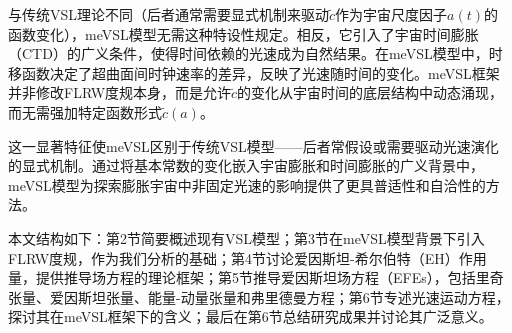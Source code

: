 \documentclass[jkps,preprint,fleqn]{revtex4}
\newcommand{\tc}{\tilde{c}}
\begin{document}
与传统VSL理论不同（后者通常需要显式机制来驱动$\tc$作为宇宙尺度因子$a(t)$的函数变化），meVSL模型无需这种特设性规定。相反，它引入了宇宙时间膨胀（CTD）的广义条件，使得时间依赖的光速成为自然结果。在meVSL模型中，时移函数决定了超曲面间时钟速率的差异，反映了光速随时间的变化\cite{Lee:2024zcu}。meVSL框架并非修改FLRW度规本身，而是允许$\tc$的变化从宇宙时间的底层结构中动态涌现，而无需强加特定函数形式$\tc(a)$。

这一显著特征使meVSL区别于传统VSL模型——后者常假设或需要驱动光速演化的显式机制\cite{Avelino:1999is,Belinchon:1999kq,Avelino:2000ph,Szydlowski:2002kz,Magueijo:2003gj,Shojaie:2004sq,Shojaie:2004xw,Balcerzak:2013kha,Balcerzak:2014rga,Franzmann:2017nsc,Hanimeli:2019wrt,Skara:2019usd,Bhattacharjee:2020fgl,Gupta:2020anq,Cuzinatto:2022mfe,Cuzinatto:2022vvy,Cuzinatto:2022dta,Bileska:2024odt,Coleman:1997xq,Albrecht:1998ir,Barrow:1998df,Barrow:1999is,Bassett:2000wj,Jacobson:2000xp,Magueijo:2000zt,Clayton:1998hv,Drummond:1999ut,Clayton:1999zs,Liberati:2000us,Clayton:2000xt,Drummond:2001rj,Amelino-Camelia:1996bln,Amelino-Camelia:1997ieq,Ellis:1999sd,Amelino-Camelia:2000bxx,Amelino-Camelia:2000cpa,Ellis:2000sf,Kowalski-Glikman:2001vvk,Bruno:2001mw,Magueijo:2001cr,Amelino-Camelia:2002uql,Magueijo:2002pg,Moffat:1992ud,Manida:1999rx,Barrow:1999st,Stepanov:1999ax,Magueijo:2000au,Moffat:2002nm,Kaelbermann:1998hu,Randall:1999ee,Randall:1999vf,Kiritsis:1999tx,Chung:1999xg,Alexander:1999cb,Ishihara:2000nf,Csaki:2000dm,Youm:2001sw,Youm:2001zk,Grojean:2001pv,Youm:2001zp,Drummond:1979pp,Novello:1988ma,Barton:1989dq,Scharnhorst:1990sr,Shore:1995fz,Colladay:1995qb,Coleman:1998ti,Bertolami:1999da,Shore:2000bs,Greenberg:2002uu,Teyssandier:2003qh,Shore:2003zc,Blasone:2003wf,Alexander:2001dr,Burgess:2002tb}。通过将基本常数的变化嵌入宇宙膨胀和时间膨胀的广义背景中，meVSL模型为探索膨胀宇宙中非固定光速的影响提供了更具普适性和自洽性的方法。

本文结构如下：第2节简要概述现有VSL模型；第3节在meVSL模型背景下引入FLRW度规，作为我们分析的基础；第4节讨论爱因斯坦-希尔伯特（EH）作用量，提供推导场方程的理论框架；第5节推导爱因斯坦场方程（EFEs），包括里奇张量、爱因斯坦张量、能量-动量张量和弗里德曼方程；第6节专述光速运动方程，探讨其在meVSL框架下的含义；最后在第6节总结研究成果并讨论其广泛意义。
\end{document}
